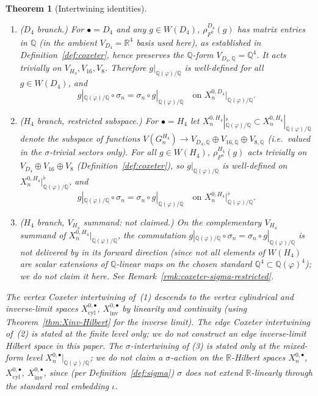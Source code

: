 \documentclass[11pt, a4paper]{amsart}
\newtheorem{theorem}{Theorem}[section]
\theoremstyle{definition}
\newcommand{\R}{\mathbb{R}}
\newcommand{\Q}{\mathbb{Q}}
\newcommand{\inv}{\mathrm{inv}}
\newcommand{\cyl}{\mathrm{cyl}}
\begin{document}
\begin{theorem}[Intertwining identities]
\begin{enumerate}
  \begin{enumerate}[label=(\roman*), leftmargin=2.6em, nosep,
    topsep=2pt]
  \item ($D_4$ branch.) For $\bullet = D_4$ and any $g \in W(D_4)$,
    $\rho_{F^0}^{D_4}(g)$ has matrix entries in $\Q$ (in the
    ambient $V_{D_4} = \R^4$ basis used here), as established in
    Definition~\ref{def:coxeter}, hence preserves the $\Q$-form
    $V_{D_4, \Q} = \Q^4$. It acts trivially on
    $V_{H_4}, V_{16}, V_8$. Therefore $g|_{\Q(\varphi)/\Q}$ is
    well-defined for all $g \in W(D_4)$, and
    \[
      g|_{\Q(\varphi)/\Q} \circ \sigma_n
      = \sigma_n \circ g|_{\Q(\varphi)/\Q}
      \quad \text{on } X_n^{0, D_4}|_{\Q(\varphi)/\Q}.
    \]
  \item ($H_4$ branch, restricted subspace.) For $\bullet = H_4$
    let $X_n^{0, H_4}|_{\Q(\varphi)/\Q}^\flat \subset
    X_n^{0, H_4}|_{\Q(\varphi)/\Q}$ denote the subspace of
    functions $V(G_n^{H_4}) \to V_{D_4, \Q} \oplus V_{16, \Q}
    \oplus V_{8, \Q}$ (i.e.\ valued in the $\sigma$-trivial
    sectors only). For all $g \in W(H_4)$, $\rho_{F^0}^{H_4}(g)$
    acts trivially on $V_{D_4} \oplus V_{16} \oplus V_8$
    (Definition~\ref{def:coxeter}), so $g|_{\Q(\varphi)/\Q}$ is
    well-defined on $X_n^{0, H_4}|_{\Q(\varphi)/\Q}^\flat$, and
    \[
      g|_{\Q(\varphi)/\Q} \circ \sigma_n
      = \sigma_n \circ g|_{\Q(\varphi)/\Q}
      \quad \text{on } X_n^{0, H_4}|_{\Q(\varphi)/\Q}^\flat.
    \]
  \item ($H_4$ branch, $V_{H_4}$ summand: not claimed.)
    On the complementary $V_{H_4}$ summand of
    $X_n^{0, H_4}|_{\Q(\varphi)/\Q}$, the commutation
    $g|_{\Q(\varphi)/\Q} \circ \sigma_n
    = \sigma_n \circ g|_{\Q(\varphi)/\Q}$ is not delivered by
    \cite[Theorem~\texttt{thm:pisigma-functorial}]{SigmaRationality}
    in its forward direction (since not all elements of $W(H_4)$
    are scalar extensions of $\Q$-linear maps on the chosen
    standard $\Q^4 \subset \Q(\varphi)^4$); we do not claim it
    here. See Remark~\ref{rmk:coxeter-sigma-restricted}.
  \end{enumerate}
\end{enumerate}
The vertex Coxeter intertwining of~(1) descends to the vertex
cylindrical and inverse-limit spaces $X_\cyl^{0, \bullet}$,
$X_\inv^{0, \bullet}$ by linearity and continuity (using
Theorem~\ref{thm:Xinv-Hilbert} for the inverse limit). The
edge Coxeter intertwining of~(2) is stated at the finite level
only; we do not construct an edge inverse-limit Hilbert space
in this paper. The
$\sigma$-intertwining of (3) is stated only at the mixed-form level
$X_n^{0, \bullet}|_{\Q(\varphi)/\Q}$; we do not claim a
$\sigma$-action on the $\R$-Hilbert spaces $X_n^{0, \bullet}$,
$X_\cyl^{0, \bullet}$, $X_\inv^{0, \bullet}$, since (per
Definition~\ref{def:sigma}) $\sigma$ does not extend $\R$-linearly
through the standard real embedding $\iota$.
\end{theorem}
\end{document}
